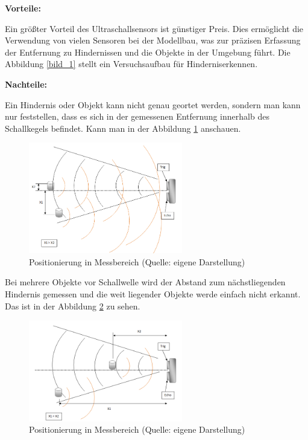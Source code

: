 \textbf{Vorteile:}  %

Ein größter Vorteil des Ultraschallsensors ist günstiger Preis. Dies ermöglicht die Verwendung von vielen Sensoren bei der Modellbau, was zur präzisen Erfassung der Entfernung zu Hindernissen und die Objekte in der Umgebung führt. Die Abbildung \ref{bild_1} stellt ein Versuchsaufbau für Hinderniserkennen. 

\par\bigskip %
\textbf{Nachteile:}  %

Ein Hindernis oder Objekt kann nicht genau geortet werden, sondern man kann nur feststellen, dass es sich in der gemessenen Entfernung innerhalb des Schallkegels befindet. Kann man in der Abbildung \ref{bild_2} anschauen.

\begin{figure}[ht]  %
	\centering\includegraphics[width=0.6\textwidth]{images/Bild-2.png}
	\caption{Positionierung in Messbereich \newline (Quelle: eigene Darstellung)}
	\label{bild_2} %
\end{figure}

Bei mehrere Objekte vor Schallwelle wird der Abstand zum nächstliegenden Hindernis gemessen und die weit liegender Objekte werde einfach nicht erkannt. Das ist in der Abbildung \ref{bild_3} zu sehen.

\begin{figure}[ht]  %
	\centering\includegraphics[width=0.6\textwidth]{images/Bild-3.png}
	\caption{Positionierung in Messbereich \newline (Quelle: eigene Darstellung)}
	\label{bild_3} %
\end{figure}

